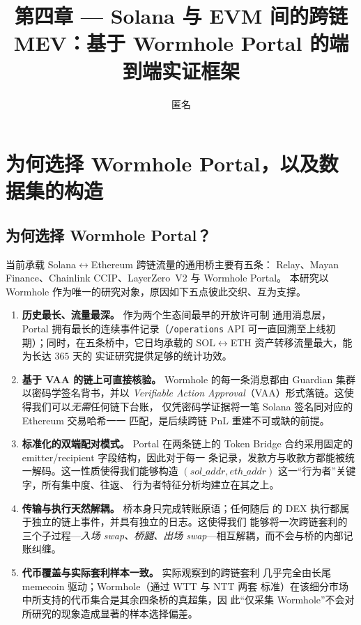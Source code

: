 \documentclass[sigconf,nonacm,10pt]{acmart}
\title{第四章 --- Solana 与 EVM 间的跨链 MEV：基于 Wormhole Portal 的端到端实证框架}
\author{匿名}
\affiliation{\institution{-}\country{-}}
\begin{document}
\maketitle



\section{为何选择 Wormhole Portal，以及数据集的构造}
\label{sec:ch4-data}

\subsection{为何选择 Wormhole Portal？}

当前承载 Solana$\leftrightarrow$Ethereum 跨链流量的通用桥主要有五条：
Relay、Mayan Finance、Chainlink CCIP、LayerZero~V2 与 Wormhole Portal。
本研究以 Wormhole 作为唯一的研究对象，原因如下五点彼此交织、互为支撑。

\begin{enumerate}
    \item \textbf{历史最长、流量最深。} 作为两个生态间最早的开放许可制
        通用消息层，Portal 拥有最长的连续事件记录（\texttt{/operations}
        API 可一直回溯至上线初期）；同时，在五条桥中，它日均承载的
        SOL$\leftrightarrow$ETH 资产转移流量最大，能为长达 $365$ 天的
        实证研究提供足够的统计功效。
    \item \textbf{基于 VAA 的链上可直接核验。} Wormhole 的每一条消息都由
        Guardian 集群以密码学签名背书，并以 \emph{Verifiable Action
        Approval}（VAA）形式落链。这使得我们可以\emph{无需}任何链下台账，
        仅凭密码学证据将一笔 Solana 签名同对应的 Ethereum 交易哈希一一
        匹配，是后续跨链 PnL 重建不可或缺的前提。
    \item \textbf{标准化的双端配对模式。} Portal 在两条链上的 Token
        Bridge 合约采用固定的 emitter/recipient 字段结构，因此对于每一
        条记录，发款方与收款方都能被统一解码。这一性质使得我们能够构造
        $(sol\_addr, eth\_addr)$ 这一“行为者”关键字，所有集中度、往返、
        行为者特征分析均建立在其之上。
    \item \textbf{传输与执行天然解耦。} 桥本身只完成转账原语；任何随后
        的 DEX 执行都属于独立的链上事件，并具有独立的日志。这使得我们
        能够将一次跨链套利的三个子过程---\emph{入场 swap、桥腿、出场
        swap}---相互解耦，而不会与桥的内部记账纠缠。
    \item \textbf{代币覆盖与实际套利样本一致。} 实际观察到的跨链套利
        几乎完全由长尾 memecoin 驱动；Wormhole（通过 WTT 与 NTT 两套
        标准）在该细分市场中所支持的代币集合是其余四条桥的真超集，因
        此“仅采集 Wormhole”不会对所研究的现象造成显著的样本选择偏差。
\end{enumerate}
\end{document}
